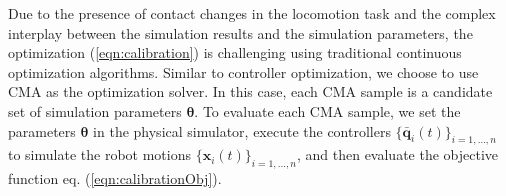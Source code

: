 Due to the presence of contact changes in the locomotion task and the complex interplay between the simulation results and the simulation parameters, the optimization (\ref{eqn:calibration}) is challenging using traditional continuous optimization algorithms. Similar to controller optimization, we choose to use CMA as the optimization solver. In this case, each CMA sample is a candidate set of simulation parameters $\boldsymbol{\theta}$. To evaluate each CMA sample, we set the parameters $\boldsymbol{\theta}$ in the physical simulator, execute the controllers $\{\bar{\mathbf{q}}_i(t)\}_{i=1,...,n}$ to simulate the robot motions $\{\mathbf{x}_i(t)\}_{i=1,...,n}$, and then evaluate the objective function eq. (\ref{eqn:calibrationObj}).

